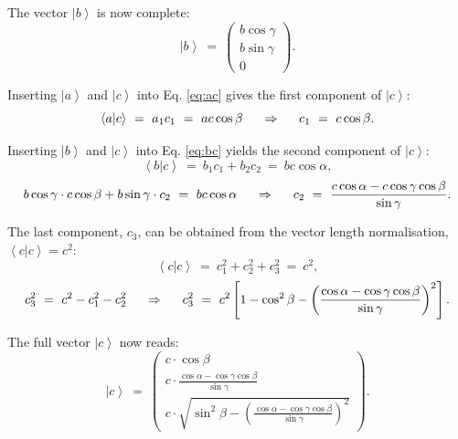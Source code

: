 The vector $\left| b \right>$ is now complete:
\begin{equation} 
\boxed{ \left| b \right> \ =\  \left( \begin{array}{c} b \cos \gamma \\ b \sin \gamma \\ 0 \end{array} \right). } 
\label{eq:bvec} 
\end{equation}


Inserting $\left| a \right>$ and $\left| c \right>$ into Eq. \ref{eq:ac} gives the first component of $\left| c \right>$:
\begin{equation} \left< a | c \right > \ =\  a_1 c_1 \ =\  ac \cos \beta
\hspace{0.5cm} \Rightarrow \hspace{0.5cm} c_1 \ =\  c \cos \beta.
\end{equation}



Inserting $\left| b \right>$ and $\left| c \right>$ into Eq. \ref{eq:bc} yields the second component of $\left| c \right>$:
\begin{equation} \left< b | c \right > \ =\  b_1 c_1 + b_2 c_2 \ =\  bc \cos \alpha, \end{equation}
\begin{equation} b \cos \gamma \cdot c \cos \beta + b \sin \gamma \cdot c_2 \ =\  bc \cos \alpha
	\hspace{0.5cm} \Rightarrow \hspace{0.5cm}
	c_2 \ =\  \frac{c \cos \alpha - c \cos \gamma \cos \beta}{\sin \gamma}. \end{equation}



The last component, $c_3$, can be obtained from the vector length normalisation, $ \left< c | c \right> = c^2 $:
\begin{equation} \left< c | c \right > \ =\  c_1^2 + c_2^2 + c_3^2 \ =\  c^2, \end{equation}
\begin{equation} c_3^2 \ =\  c^2 - c_1^2 - c_2^2
	\hspace{0.5cm} \Rightarrow \hspace{0.5cm}
	c_3^2 \ =\  c^2 \left[1 - \cos^2 \beta - \left(\frac{\cos \alpha - \cos \gamma \cos \beta}{\sin \gamma} \right)^2 \right].
\end{equation}

The full vector $\left| c \right>$ now reads:
\begin{equation} \boxed{ \left| c \right> \ =\  \left( \begin{array}{c}
	c \cdot \cos \beta \\
	c \cdot \frac{\cos \alpha - \cos \gamma \cos \beta}{\sin \gamma} \\
	c \cdot \sqrt{ \sin^2 \beta - \left(\frac{\cos \alpha - \cos \gamma \cos \beta}{\sin \gamma} \right)^2 }
\end{array} \right). } \end{equation}



